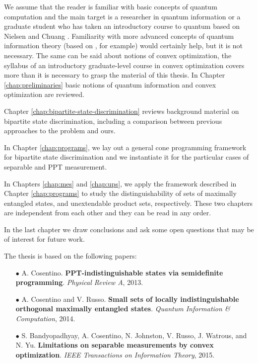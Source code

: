 We assume that the reader is familiar with basic concepts of quantum computation and 
the main target is a researcher in quantum information or a graduate student 
who has taken an introductory course to quantum based on Nielsen and Chuang \cite{Nielsen11}.
Familiarity with more advanced concepts of quantum information theory (based 
on \cite{Watrous15}, for example) would certainly help, but it is not necessary.
The same can be said about notions of convex optimization, the syllabus of an introductory 
graduate-level course in convex optimization covers more than it is necessary to grasp
the material of this thesis.
In Chapter \ref{chap:preliminaries} basic notions of quantum information and convex optimization 
are reviewed. 

Chapter \ref{chap:bipartite-state-discrimination} reviews background material 
on bipartite state discrimination, including a comparison between previous approaches 
to the problem and ours.

In Chapter \ref{chap:programs}, we lay out a general cone programming framework
for bipartite state discrimination and we instantiate it for the particular cases
of separable and PPT measurement. 

In Chapters \ref{chap:mes} and \ref{chap:ups}, we apply the framework described in Chapter 
\ref{chap:programs} to study the distinguishability of sets of maximally entangled states, 
and unextendable product sets, respectively.
These two chapters are independent from each other and they can be read in any order.

In the last chapter we draw conclusions and ask some open questions that may be
of interest for future work. 

The thesis is based on the following papers:
\begin{itemize}

\item[$\bullet$]
 A. Cosentino. 
\textbf{PPT-indistinguishable states via semidefinite programming}. 
\textit{Physical Review A}, 2013.
\cite{Cosentino13}

\item[$\bullet$]
A. Cosentino and V. Russo.
\textbf{Small sets of locally indistinguishable orthogonal maximally entangled states}. 
\textit{Quantum Information \& Computation},  2014.
\cite{Cosentino14}

\item[$\bullet$] 
S. Bandyopadhyay, A. Cosentino, N. Johnston, V. Russo, J. Watrous, and N. Yu. 
\textbf{Limitations on separable measurements by convex optimization}. 
\textit{IEEE Transactions on Information Theory}, 2015.
\cite{Bandyopadhyay15}

\end{itemize}